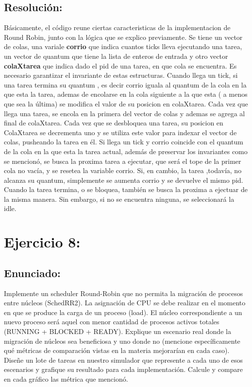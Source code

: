 \documentclass[10pt, a4paper]{article}
\begin{document}
\subsection{Resolución:}

Básicamente, el código reune ciertas caracteristicas de la implementacion de Round Robin, junto con la lógica que se explico previamente.
Se tiene un vector de colas, una variale \textbf{corrio} que indica cuantos ticks lleva ejecutando una tarea,  un vector de quantum que tiene la lista de enteros de entrada y otro vector \textbf{colaXtarea} que indica dado el pid de una tarea, en que cola se encuentra.
Es necesario garantizar el invariante de estas estructuras. Cuando llega un tick, si una tarea  termina su quantum , es decir corrio iguala al quantum de la cola en la que esta la tarea, ademas de encolarse en la cola siguiente a la que esta ( a menos que sea la última) se modifica el valor de su posicion en colaXtarea.
Cada vez que llega una tarea, se encola en la primera del vector de colas y ademas se agrega al final de colaXtarea.
Cada vez que se desbloquea una tarea, su posicion en ColaXtarea se decrementa uno y se utiliza este valor para indexar el vector de colas, pusheando la tarea en él.
Si llega un tick y corrio coincide con el quantum de la cola en la que esta la tarea actual, además de preservar los invariantes como se mencionó, se busca la proxima tarea a ejecutar, que será el tope de la primer cola no vacía, y se resetea la variable corrio. Si, en cambio, la tarea ,todavía, no alcanza su quantum, simplemente se aumenta corrio y se  devuelve el mismo pid.
Cuando la tarea termina, o se bloquea, también se busca la proxima a ejectuar de la misma manera. Sin embargo, si no se encuentra ninguna, se seleccionará la idle.

\section{Ejercicio 8:}
	
\subsection{Enunciado:}
Implemente un scheduler Round-Robin que no permita la migración de procesos
entre núcleos (SchedRR2). La asignación de CPU se debe realizar en el momento en que se produce la carga de un proceso (load). El núcleo correspondiente a un nuevo proceso será aquel
con menor cantidad de procesos activos totales (RUNNING + BLOCKED + READY). Explique un escenario real donde la migración de núcleos sea beneficiosa y uno donde no (mencione
específicamente qué métricas de comparación vistas en la materia mejorarían en cada caso).
Diseñe un lote de tareas en nuestro simulador que represente a cada uno de esos escenarios y grafique su resultado para cada implementación. Calcule y compare en cada gráfico las
métrica que mencionó.
\end{document}
